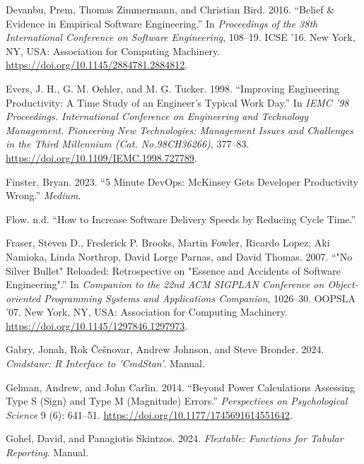 \documentclass[
]{article}
\newlength{\cslhangindent}
\newenvironment{CSLReferences}[2] %
 {\begin{list}{}{%
  \setlength{\itemindent}{0pt}
  \setlength{\leftmargin}{0pt}
  \setlength{\parsep}{0pt}
  \ifodd #1
   \setlength{\leftmargin}{\cslhangindent}
   \setlength{\itemindent}{-1\cslhangindent}
  \fi
  \setlength{\itemsep}{#2\baselineskip}}}
 {\end{list}}
\begin{document}
\begin{CSLReferences}{1}{0}
Devanbu, Prem, Thomas Zimmermann, and Christian Bird. 2016. {``Belief \&
Evidence in Empirical Software Engineering.''} In \emph{Proceedings of
the 38th {International Conference} on {Software Engineering}}, 108--19.
{ICSE} '16. New York, NY, USA: Association for Computing Machinery.
\url{https://doi.org/10.1145/2884781.2884812}.

Evers, J. H., G. M. Oehler, and M. G. Tucker. 1998. {``Improving
Engineering Productivity: A Time Study of an Engineer's Typical Work
Day.''} In \emph{{IEMC} '98 {Proceedings}. {International Conference} on
{Engineering} and {Technology Management}. {Pioneering New
Technologies}: {Management Issues} and {Challenges} in the {Third
Millennium} ({Cat}. {No}.{98CH36266})}, 377--83.
\url{https://doi.org/10.1109/IEMC.1998.727789}.

Finster, Bryan. 2023. {``5 {Minute DevOps}: {McKinsey Gets Developer
Productivity Wrong}.''} \emph{Medium}.

Flow. n.d. {``How to Increase Software Delivery Speeds by Reducing Cycle
Time.''}

Fraser, Steven D., Frederick P. Brooks, Martin Fowler, Ricardo Lopez,
Aki Namioka, Linda Northrop, David Lorge Parnas, and David Thomas. 2007.
{``"{No} Silver Bullet" Reloaded: Retrospective on "Essence and
Accidents of Software Engineering".''} In \emph{Companion to the 22nd
{ACM SIGPLAN} Conference on {Object-oriented} Programming Systems and
Applications Companion}, 1026--30. {OOPSLA} '07. New York, NY, USA:
Association for Computing Machinery.
\url{https://doi.org/10.1145/1297846.1297973}.

Gabry, Jonah, Rok Češnovar, Andrew Johnson, and Steve Bronder. 2024.
\emph{Cmdstanr: {R Interface} to '{CmdStan}'}. Manual.

Gelman, Andrew, and John Carlin. 2014. {``Beyond {Power Calculations
Assessing Type S} ({Sign}) and {Type M} ({Magnitude}) {Errors}.''}
\emph{Perspectives on Psychological Science} 9 (6): 641--51.
\url{https://doi.org/10.1177/1745691614551642}.

Gohel, David, and Panagiotis Skintzos. 2024. \emph{Flextable:
{Functions} for Tabular Reporting}. Manual.


\end{CSLReferences}
\end{document}
